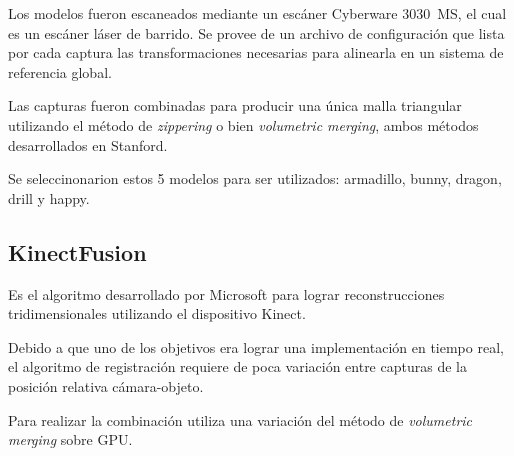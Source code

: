 \documentclass{pfc}
\begin{document}
			Los modelos fueron escaneados mediante un escáner Cyberware 3030~MS,
			el cual es un escáner láser de barrido.
			Se provee de un archivo de configuración que lista por cada captura
			las transformaciones necesarias para alinearla en un sistema de
			referencia global.

			Las capturas fueron combinadas para producir una única malla
			triangular utilizando el método de \emph{zippering} o bien
			\emph{volumetric merging}, ambos métodos desarrollados en Stanford.\cite{StanfordScanRep}


			Se seleccinonarion estos 5 modelos para ser utilizados: armadillo, bunny, dragon, drill y happy.

		\subsection{KinectFusion}
			Es el algoritmo desarrollado por Microsoft para lograr reconstrucciones tridimensionales utilizando el dispositivo Kinect.

			Debido a que uno de los objetivos era lograr
			una implementación en tiempo real,
			el algoritmo de registración requiere de
			poca variación entre capturas de
			la posición relativa cámara-objeto.

			Para realizar la combinación utiliza una variación del método de
			\emph{volumetric merging} sobre GPU.\cite{Izadi:2011:KRR:2047196.2047270}



\end{document}
